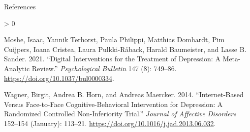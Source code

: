 \documentclass[
  8pt,
  ignorenonframetext,
]{beamer}
\newlength{\cslhangindent}
\newenvironment{CSLReferences}[2] %
 {%
  \setlength{\parindent}{0pt}
  \ifodd #1 \everypar{\setlength{\hangindent}{\cslhangindent}}\ignorespaces\fi
  \ifnum #2 > 0
  \setlength{\parskip}{#2\baselineskip}
  \fi
 }%
 {}
\begin{document}
\begin{frame}{References}
\protect\hypertarget{references}{}
\footnotesize

\hypertarget{refs}{}
\begin{CSLReferences}{1}{0}
\leavevmode\hypertarget{ref-moshe_2021}{}%
Moshe, Isaac, Yannik Terhorst, Paula Philippi, Matthias Domhardt, Pim
Cuijpers, Ioana Cristea, Laura Pulkki-Råback, Harald Baumeister, and
Lasse B. Sander. 2021. {``Digital Interventions for the Treatment of
Depression: {A} Meta-Analytic Review.''} \emph{Psychological Bulletin}
147 (8): 749--86. \url{https://doi.org/10.1037/bul0000334}.

\leavevmode\hypertarget{ref-wagner_2014}{}%
Wagner, Birgit, Andrea B. Horn, and Andreas Maercker. 2014.
{``Internet-Based Versus Face-to-Face Cognitive-Behavioral Intervention
for Depression: {A} Randomized Controlled Non-Inferiority Trial.''}
\emph{Journal of Affective Disorders} 152--154 (January): 113--21.
\url{https://doi.org/10.1016/j.jad.2013.06.032}.

\end{CSLReferences}
\end{frame}
\end{document}
